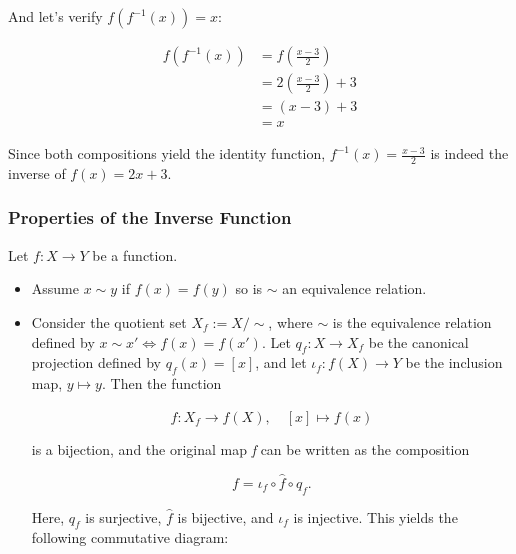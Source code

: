 And let's verify \(f(f^{-1}(x)) = x\):

\begin{align*}
	f(f^{-1}(x)) & = f\left(\frac{x - 3}{2}\right)     \\
	             & = 2\left(\frac{x - 3}{2}\right) + 3 \\
	             & = (x - 3) + 3                       \\
	             & = x
\end{align*}

Since both compositions yield the identity function, \(f^{-1} (x) = \frac{x - 3}{2}\) is indeed the 
inverse of \(f (x) = 2x + 3\).

\subsubsection{Properties of the Inverse Function}

Let \(f:X\to Y\) be a function.

\begin{itemize}

	\item Assume \(x \sim y \) if \(f(x)= f(y)\) so is \(\sim\) an equivalence relation.

	\item Consider the quotient set \( X_f := X/\sim \), where \( \sim \) is the equivalence relation 
	      defined by \( x \sim x' \iff f(x) = f(x') \). Let \( q_f : X \to X_f \) be the canonical 
		  projection defined by \( q_f(x) = [x] \), and let \( \iota_f : f(X) \to Y \) be the inclusion  
		  map, \( y \mapsto y \). Then the function
	      
		  \[
		      \hat{f} : X_f \to f(X), \quad [x] \mapsto f(x)
	      \]
	  
		  is a bijection, and the original map \emph{f} can be written as the composition
	 
		  \[
		      f = \iota_f \circ \hat{f} \circ q_f.
	      \]
	 
		  Here, \( q_f \) is surjective, \( \hat{f} \) is bijective, and \( \iota_f \) is injective. 
		  This yields the following commutative diagram:
	      
		  \begin{center}
	      \end{center}

\end{itemize}

